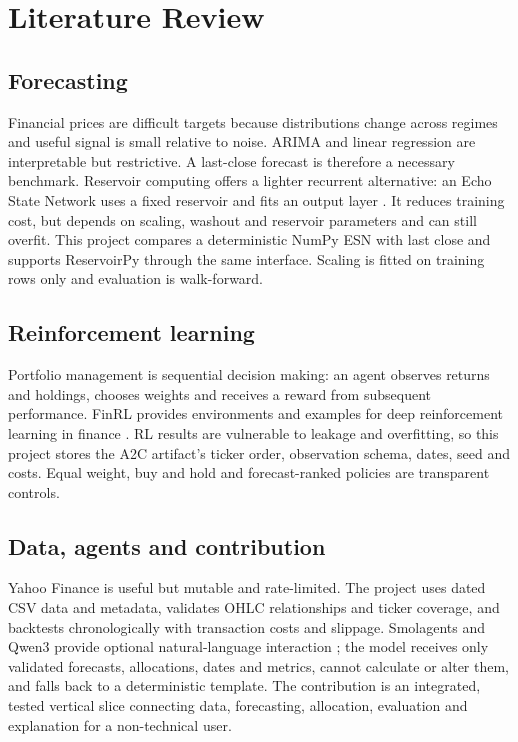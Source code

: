 \chapter{Literature Review}
\section{Forecasting}
Financial prices are difficult targets because distributions change across regimes and useful signal is small relative to noise. ARIMA and linear regression are interpretable but restrictive. A last-close forecast is therefore a necessary benchmark. Reservoir computing offers a lighter recurrent alternative: an Echo State Network uses a fixed reservoir and fits an output layer \cite{jaeger2001echo,lukosevicius2009reservoir}. It reduces training cost, but depends on scaling, washout and reservoir parameters and can still overfit. This project compares a deterministic NumPy ESN with last close and supports ReservoirPy through the same interface. Scaling is fitted on training rows only and evaluation is walk-forward.

\section{Reinforcement learning}
Portfolio management is sequential decision making: an agent observes returns and holdings, chooses weights and receives a reward from subsequent performance. FinRL provides environments and examples for deep reinforcement learning in finance \cite{yang2020finrl}. RL results are vulnerable to leakage and overfitting, so this project stores the A2C artifact's ticker order, observation schema, dates, seed and costs. Equal weight, buy and hold and forecast-ranked policies are transparent controls.

\section{Data, agents and contribution}
Yahoo Finance is useful but mutable and rate-limited. The project uses dated CSV data and metadata, validates OHLC relationships and ticker coverage, and backtests chronologically with transaction costs and slippage. Smolagents and Qwen3 provide optional natural-language interaction \cite{smolagents,qwen}; the model receives only validated forecasts, allocations, dates and metrics, cannot calculate or alter them, and falls back to a deterministic template. The contribution is an integrated, tested vertical slice connecting data, forecasting, allocation, evaluation and explanation for a non-technical user.
